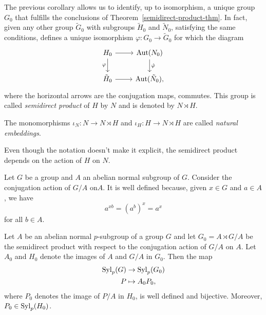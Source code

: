 \begin{defn}
    The previous corollary allows us to identify, up to isomorphism, a unique group $G_0$ that fulfills the conclusions of\/ {\rm Theorem~\ref{semidirect-product-thm}}. In fact, given any other group $\tilde G_0$ with subgroups $\tilde H_0$ and $\tilde N_0$, satisfying the same conditions, defines a unique isomorphism $\varphi\colon G_0\to\tilde G_0$ for which the diagram
    $$
        \begin{tikzcd}
            H_0\arrow[r]\arrow[d,"\varphi"']
                &\Aut(N_0)\arrow[d,"\hat\varphi"]
                \\
            \tilde H_0\arrow[r]
                &\Aut(\tilde N_0),
        \end{tikzcd}
    $$
    where the horizontal arrows are the conjugation maps, commutes. This group is called \textsl{semidirect product} of\/ $H$ by\/ $N$ and is denoted by\/ $N\rtimes H$.

    The monomorphisms $\iota_N\colon N\to N\rtimes H$ and $\iota_H\colon H\to N\rtimes H$ are called \textsl{natural embeddings}.

    Even though the notation doesn't make it explicit, the semidirect product depends on the action of\/ $H$ on\/ $N$.
\end{defn}

\begin{rem}
Let\/ $G$ be a group and\/ $A$ an abelian normal subgroup of\/ $G$. Consider the conjugation action of\/ $G/A$ on\/$A$. It is well defined because, given\/ $x\in G$ and\/ $a\in A$, we have
$$
a^{xb}=(a^b)^x=a^x
$$
for all\/ $b\in A$.
\end{rem}

\begin{prop}\label{normal-abelian-to-semidirect}
    Let\/ $A$ be an abelian normal\/ $p$-subgroup of a group\/ $G$ and let\/ $G_0=A\rtimes G/A$ be the semidirect product with respect to the conjugation action of\/ $G/A$ on\/ $A$. Let\/ $A_0$ and\/ $H_0$ denote the images of\/ $A$ and\/ $G/A$ in\/ $G_0$. Then the map
    \begin{align*}
        {\rm Syl}_p(G)&\to {\rm Syl}_p(G_0)\\
        P&\mapsto A_0P_0,
    \end{align*}
    where\/ $P_0$ denotes the image of\/ $P/A$ in\/ $H_0$, is well defined and bijective. Moreover, $P_0\in{\rm Syl}_p(H_0)$.
\end{prop}

